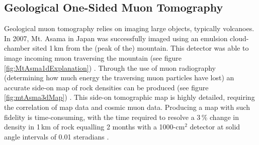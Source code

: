 
\vspace{3cm}

\subsection{Geological One-Sided Muon Tomography}  \label{sec:geologicalTomography} %
Geological muon tomography relies on imaging large objects, typically volcanoes. In 2007, Mt. Asama in Japan was successfully imaged using an emulsion cloud-chamber sited 1\,km from the (peak of the) mountain. This detector was able to image incoming muon traversing the mountain (see figure \ref{fig:MtAsma1dExplanation}) \cite{Tanaka_mtAsama_2007}. Through the use of muon radiography (determining how much energy the traversing muon particles have lost) an accurate side-on map of rock densities can be produced (see figure \ref{fig:mtAsma3dMap}) \cite{Tanaka_mtAsama_2007}. This side-on tomographic map is highly detailed, requiring the correlation of map data and cosmic muon data. Producing a map with such fidelity is time-consuming, with the time required to resolve a 3\,\% change in density in 1\,km of rock equalling 2 months with a 1000-cm$^2$ detector at solid angle intervals of 0.01 steradians \cite{Tanaka_mtAsama_2007}.

